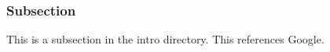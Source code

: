 \subsubsection{Subsection}
This is a subsection in the intro directory. This references Google\cite{google}.
